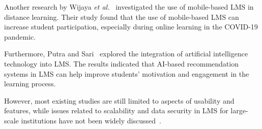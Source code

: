 Another research by Wijaya \textit{et al.}~\cite{wijaya2021} investigated the use of mobile-based LMS in distance learning. Their study found that the use of mobile-based LMS can increase student participation, especially during online learning in the COVID-19 pandemic.

Furthermore, Putra and Sari~\cite{putra2022} explored the integration of artificial intelligence technology into LMS. The results indicated that AI-based recommendation systems in LMS can help improve students' motivation and engagement in the learning process.

However, most existing studies are still limited to aspects of usability and features, while issues related to scalability and data security in LMS for large-scale institutions have not been widely discussed~\cite{kumar2019}.
